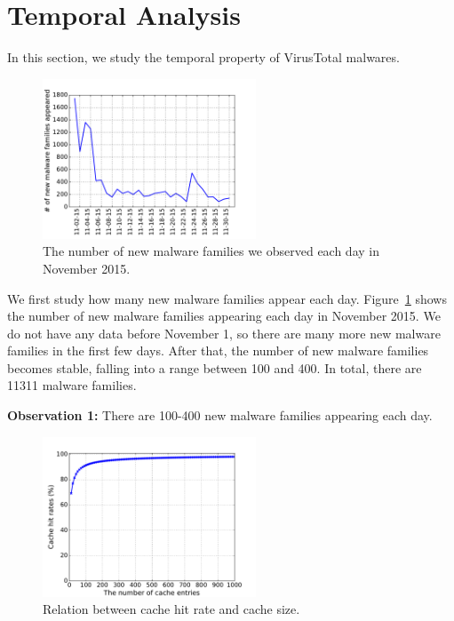 
\section{Temporal Analysis}
\label{sec:temporal}

In this section, we study the temporal property of VirusTotal malwares. 

\begin{figure}[t!]
\begin{center}
\includegraphics[width=2.5in]{figure/new_family}
\caption{The number of new malware families we observed each day in November 2015.}
\label{fig:new}
\end{center}
\end{figure}


We first study how many new malware families appear each day. 
Figure~\ref{fig:new} shows the number of new malware families appearing each day in November 2015. 
We do not have any data before November 1, 
so there are many more new malware families in the first few days.
After that, the number of new malware families becomes stable, falling into a range between 100 and 400. 
In total, there are 11311 malware families. 

{\bf Observation 1:} 
There are 100-400 new malware families appearing each day. 


\begin{figure}[t!]
\begin{center}
\includegraphics[width=2.5in]{figure/LRU}
\caption{Relation between cache hit rate and cache size.}
\label{fig:cache}
\end{center}
\end{figure}


